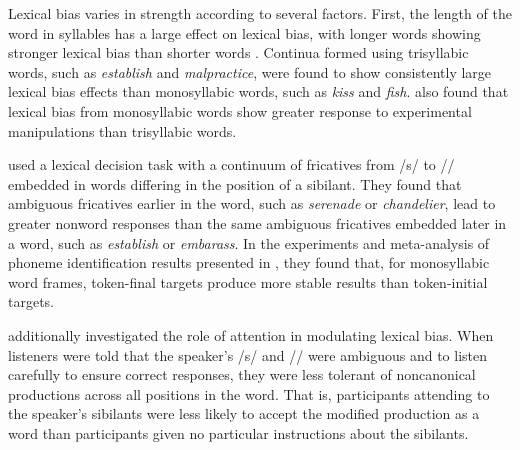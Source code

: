 Lexical bias varies in strength according to several factors.  
First, the length of the word in syllables has a large effect on lexical bias, with longer words showing stronger lexical bias than shorter words \citep{Pitt2006}.  
Continua formed using trisyllabic words, such as \emph{establish} and \emph{malpractice}, were found to show consistently large lexical bias effects than monosyllabic words, such as \emph{kiss} and \emph{fish}.  
\citet{Pitt2006} also found that lexical bias from monosyllabic words show greater response to experimental manipulations than trisyllabic words.

\citet{Pitt2012} used a lexical decision task with a continuum of fricatives from /s/ to /\textesh/ embedded in words differing in the position of a sibilant.  
They found that ambiguous fricatives earlier in the word, such as \emph{serenade} or \emph{chandelier}, lead to greater nonword responses than the same ambiguous fricatives embedded later in a word, such as \emph{establish} or \emph{embarass}.  
In the experiments and meta-analysis of phoneme identification results presented in \citet{Pitt1993}, they found that, for monosyllabic word frames, token-final targets produce more stable results than token-initial targets.

\citet{Pitt2012} additionally investigated the role of attention in modulating lexical bias.  
When listeners were told that the speaker's /s/ and /\textesh/ were ambiguous and to listen carefully to ensure correct responses, they were less tolerant of noncanonical productions across all positions in the word.  
That is, participants attending to the speaker's sibilants were less likely to accept the modified production as a word than participants given no particular instructions about the sibilants.

